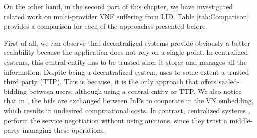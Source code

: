 On the other hand, in the second part of this chapter, we have investigated related work on multi-provider VNE suffering from LID. Table \ref{tab:Comparison} provides a comparison for each of the approaches presented before. 

First of all, we can observe that decentralized systems provide obviously a better scalability because the application does not rely on a single point. In centralized systems, this central entity has to be trusted since it stores and manages all the information. Despite being a decentralized system, \cite{zaheer2010multi} uses to some extent a trusted third party (TTP). This is because, it is the only approach that offers sealed-bidding between users, although using a central entity or TTP. We also notice that in \cite{esposito2013general}, \cite{chowdhury2010polyvine} the bids are exchanged between InPs to cooperate in the VN embedding, which results in undesired computational costs. In contrast, centralized systems \citep{dietrich2015multi}, perform the service negotiation without using auctions, since they trust a middle-party managing these operations.

